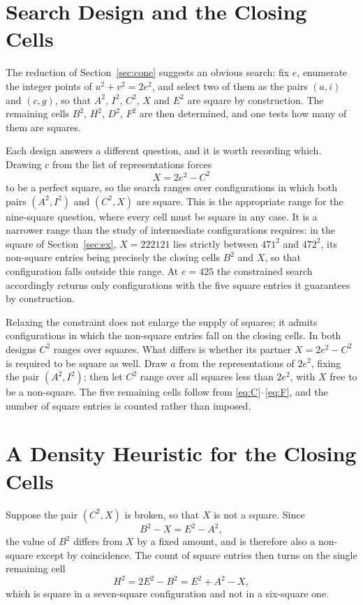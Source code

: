 \documentclass[12pt]{article}
\theoremstyle{remark}
\begin{document}
\section{Search Design and the Closing Cells}

The reduction of Section~\ref{sec:cone} suggests an obvious search:
fix $e$, enumerate the integer points of $u^2+v^2 = 2e^2$, and select
two of them as the pairs $(a,i)$ and $(c,g)$, so that $A^2$, $I^2$,
$C^2$, $X$ and $E^2$ are square by construction. The remaining cells
$B^2$, $H^2$, $D^2$, $F^2$ are then determined, and one tests how many
of them are squares.

Each design answers a different question, and it is worth recording
which. Drawing $c$ from the list of representations forces
\[
X = 2e^2 - C^2
\]
to be a perfect square, so the search ranges over configurations in
which both pairs $(A^2, I^2)$ and $(C^2, X)$ are square. This is the
appropriate range for the nine-square question, where every cell must
be square in any case. It is a narrower range than the study of
intermediate configurations requires: in the square of
Section~\ref{sec:ex}, $X = 222121$ lies strictly between $471^2$ and
$472^2$, its non-square entries being precisely the closing cells
$B^2$ and $X$, so that configuration falls outside this range. At
$e = 425$ the constrained search accordingly returns only
configurations with the five square entries it guarantees by
construction.

Relaxing the constraint does not enlarge the supply of squares; it
admits configurations in which the non-square entries fall on the
closing cells. In both designs $C^2$ ranges over squares. What differs
is whether its partner $X = 2e^2 - C^2$ is required to be square as
well. Draw $a$ from the representations of $2e^2$, fixing the pair
$(A^2, I^2)$; then let $C^2$ range over all squares less than $2e^2$,
with $X$ free to be a non-square. The five remaining cells follow from
\eqref{eq:C}--\eqref{eq:F}, and the number of square entries is
counted rather than imposed.

\section{A Density Heuristic for the Closing Cells}

Suppose the pair $(C^2, X)$ is broken, so that $X$ is not a square.
Since
\[
B^2 - X = E^2 - A^2 ,
\]
the value of $B^2$ differs from $X$ by a fixed amount, and is
therefore also a non-square except by coincidence. The count of square
entries then turns on the single remaining cell
\[
H^2 = 2E^2 - B^2 = E^2 + A^2 - X ,
\]
which is square in a seven-square configuration and not in a
six-square one.
\end{document}
